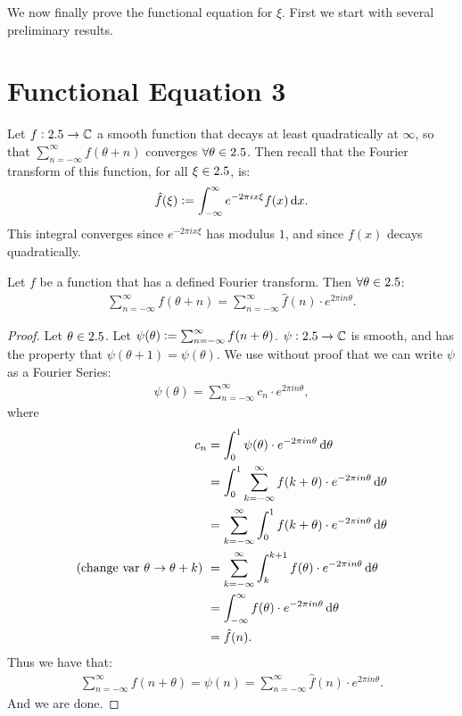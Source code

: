 \setcounter{section}{0}
\setcounter{theorem}{0}



We now finally prove the functional equation for $\xi$. First we start with several preliminary results.

\section{Functional Equation 3}

Let $f: 2.5 \to \mathbb{C}$ a smooth function that decays at least quadratically at $\infty$, so that $\sum_{n=-\infty}^{\infty} f(\theta+n)$ converges $\forall \theta \in 2.5$. Then recall that the Fourier transform of this function, for all $\xi \in 2.5$, is:
\begin{align*}
    \hat{f}(\xi) \defas \int_{-\infty}^\infty e^{-2 \pi i x \xi} f(x) \dif x.
\end{align*}
This integral converges since $e^{-2 \pi i x \xi}$ has modulus $1$, and since $f(x)$ decays quadratically.

\begin{proposition}\label{prop:poisson-sum}
Let $f$ be a function that has a defined Fourier transform. Then $\forall \theta \in 2.5$:
\begin{align*}
    \sum_{n=-\infty}^\infty f(\theta + n) = \sum_{n=-\infty}^\infty \hat{f}(n) \cdot e^{2 \pi i n \theta}.
\end{align*}
\end{proposition}
\begin{proof}
Let $\theta \in 2.5$. Let $\psi(\theta) \vcentcolon = \sum_{n=-\infty}^{\infty} f(n+\theta)$. $\psi : 2.5 \to \mathbb{C}$ is smooth, and has the property that $\psi(\theta+1) = \psi(\theta) $. We use without proof that we can write $\psi$ as a Fourier Series:
\begin{align*}
    \psi(\theta) = \sum_{n=-\infty}^{\infty} c_n \cdot e^{2 \pi i n \theta},
\end{align*}
where
\begin{align*}
    c_n &= \int_0^1 \psi(\theta) \cdot e^{-2 \pi i n \theta} \dif \theta \\ &= \int_0^1 \sum_{k=-\infty}^{\infty} f(k+\theta) \cdot e^{-2 \pi i n \theta} \dif \theta \\&=  \sum_{k=-\infty}^{\infty} \int_0^1 f(k+\theta) \cdot e^{-2 \pi i n \theta} \dif \theta \\ \text{(change var $\theta \to \theta +k$) } &= \sum_{k=-\infty}^{\infty} \int_k^{k+1} f(\theta) \cdot e^{-2 \pi i n \theta} \dif \theta \\
    &= \int_{-\infty}^{\infty} f(\theta) \cdot e^{-2 \pi i n \theta} \dif \theta \\&= \hat{f}(n).
\end{align*}
Thus we have that:
\begin{align*}
    \sum_{n=-\infty}^{\infty} f(n+\theta) = \psi(n) = \sum_{n=-\infty}^{\infty} \hat{f}(n) \cdot e^{2 \pi i n \theta}.
\end{align*}
And we are done.
\end{proof}

